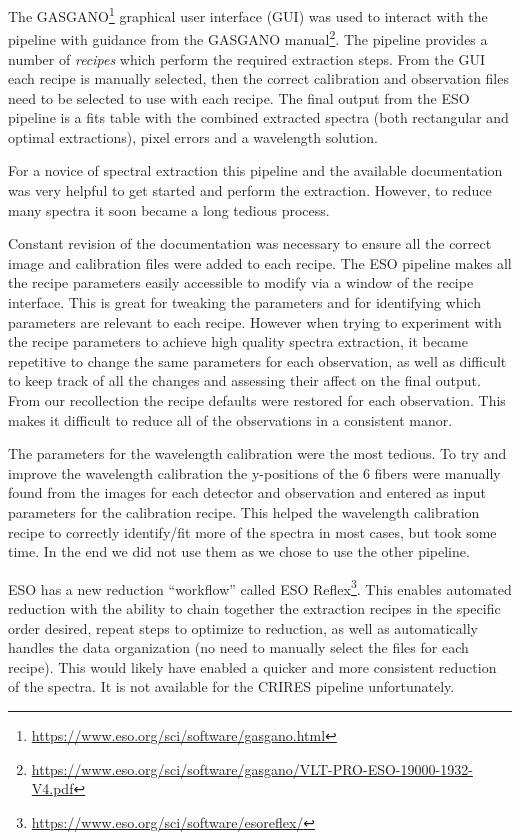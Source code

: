 The GASGANO\footnote{\href{https://www.eso.org/sci/software/gasgano.html}{https://www.eso.org/sci/software/gasgano.html}} graphical user interface (GUI) was used to interact with the pipeline with guidance from the GASGANO manual\footnote{\href{https://www.eso.org/sci/software/gasgano/VLT-PRO-ESO-19000-1932-V4.pdf}{https://www.eso.org/sci/software/gasgano/VLT-PRO-ESO-19000-1932-V4.pdf}}. The pipeline provides a number of \emph{recipes} which perform the required extraction steps. From the GUI each recipe is manually selected, then the correct calibration and observation files need to be selected to use with each recipe.  The final output from the ESO pipeline is a fits table with the combined extracted spectra (both rectangular and optimal extractions), pixel errors and a wavelength solution.

For a novice of spectral extraction this pipeline and the available documentation was very helpful to get started and perform the extraction. However, to reduce many spectra it soon became a long tedious process.

Constant revision of the documentation was necessary to ensure all the correct image and calibration files were added to each recipe. The ESO pipeline makes all the recipe parameters easily accessible to modify via a window of the recipe interface. This is great for tweaking the parameters and for identifying which parameters are relevant to each recipe. However when trying to experiment with the recipe parameters to achieve high quality spectra extraction, it became repetitive to change the same parameters for each observation, as well as difficult to keep track of all the changes and assessing their affect on the final output. From our recollection the recipe defaults were restored for each observation. This makes it difficult to reduce all of the observations in a consistent manor.

The parameters for the wavelength calibration were the most tedious. To try and improve the wavelength calibration the {y-positions} of the 6 {\thar} fibers were manually found from the images for each detector  and observation and entered as input parameters for the calibration recipe. This helped the wavelength calibration recipe to correctly identify/fit more of the {\thar} spectra in most cases, but took some time. In the end we did not use them as we chose to use the other pipeline.

ESO has a new reduction ``workflow'' called ESO Reflex\citep{freudling_automated_2013}\footnote{\href{https://www.eso.org/sci/software/esoreflex/}{https://www.eso.org/sci/software/esoreflex/}}. This enables automated reduction with the ability to chain together the extraction recipes in the specific order desired, repeat steps to optimize to reduction, as well as automatically handles the data organization (no need to manually select the files for each recipe). This would likely have enabled a quicker and more consistent reduction of the spectra. It is not available for the CRIRES pipeline unfortunately.

